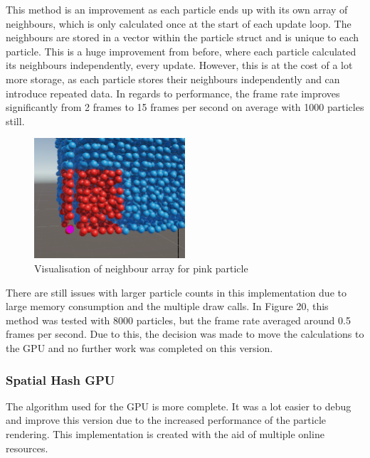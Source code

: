 \documentclass[12pt]{article}
\begin{document}
    This method is an improvement as each particle ends up with its own array of neighbours, which is only calculated once at the start of each update loop. The neighbours are stored in a vector within the particle struct and is unique to each particle. This is a huge improvement from before, where each particle calculated its neighbours independently, every update. However, this is at the cost of a lot more storage, as each particle stores their neighbours independently and can introduce repeated data. In regards to performance, the frame rate improves significantly from 2 frames to 15 frames per second on average with 1000 particles still.

    \begin{figure}[H]
        \begin{center}
            \includegraphics[width=0.5\textwidth]{neighboursCPU.png}
            \caption{Visualisation of neighbour array for pink particle}
        \end{center}
    \end{figure}

    There are still issues with larger particle counts in this implementation due to large memory consumption and the multiple draw calls. In Figure 20, this method was tested with 8000 particles, but the frame rate averaged around 0.5 frames per second. Due to this, the decision was made to move the calculations to the GPU and no further work was completed on this version.

    \subsubsection{Spatial Hash GPU}
    
    The algorithm used for the GPU is more complete. It was a lot easier to debug and improve this version due to the increased performance of the particle rendering. This implementation is created with the aid of multiple online resources\cite{lague}\cite{sphspatialexample}\cite{bitonicyt}\cite{bitonicparallel}.
\end{document}
